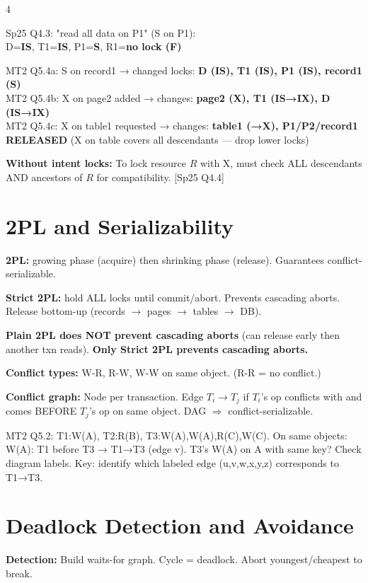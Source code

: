 \documentclass[8pt,letterpaper]{article}
\newcommand{\key}[1]{\textbf{\color{red!70!black}#1}}
\newcommand{\ans}[1]{\textbf{\color{blue!80!black}#1}}
\newcommand{\warn}[1]{\textbf{\color{orange!85!black}#1}}
\newcommand{\qref}[1]{{\fontsize{3.5}{4}\selectfont\color{purple!60!black}[#1]}}
\begin{document}
\begin{multicols*}{4}
\begin{ansbox}
Sp25 Q4.3: "read all data on P1" (S on P1):\\
D=\ans{IS}, T1=\ans{IS}, P1=\ans{S}, R1=\ans{no lock (F)}
\end{ansbox}

\begin{ansbox}
MT2 Q5.4a: S on record1 → changed locks: \ans{D (IS), T1 (IS), P1 (IS), record1 (S)}\\
MT2 Q5.4b: X on page2 added → changes: \ans{page2 (X), T1 (IS→IX), D (IS→IX)}\\
MT2 Q5.4c: X on table1 requested → changes: \ans{table1 (→X), P1/P2/record1 RELEASED} (X on table covers all descendants — drop lower locks)
\end{ansbox}

\key{Without intent locks:} To lock resource $R$ with X, must check ALL descendants AND ancestors of $R$ for compatibility. \qref{Sp25 Q4.4}

\section{2PL and Serializability}
\key{2PL:} growing phase (acquire) then shrinking phase (release). Guarantees conflict-serializable.

\key{Strict 2PL:} hold ALL locks until commit/abort. Prevents cascading aborts. Release bottom-up (records $\to$ pages $\to$ tables $\to$ DB).

\key{Plain 2PL does NOT prevent cascading aborts} (can release early then another txn reads). \warn{Only Strict 2PL prevents cascading aborts.}

\key{Conflict types:} W-R, R-W, W-W on same object. (R-R = no conflict.)

\key{Conflict graph:} Node per transaction. Edge $T_i\to T_j$ if $T_i$'s op conflicts with and comes BEFORE $T_j$'s op on same object. DAG $\Rightarrow$ conflict-serializable.

\begin{ansbox}
MT2 Q5.2: T1:W(A), T2:R(B), T3:W(A),W(A),R(C),W(C). On same objects:\\
W(A): T1 before T3 → T1→T3 (edge v). T3's W(A) on A with same key? Check diagram labels. Key: identify which labeled edge (u,v,w,x,y,z) corresponds to T1→T3.
\end{ansbox}

\section{Deadlock Detection and Avoidance}
\key{Detection:} Build waits-for graph. Cycle = deadlock. Abort youngest/cheapest to break.


\end{multicols*}
\end{document}

